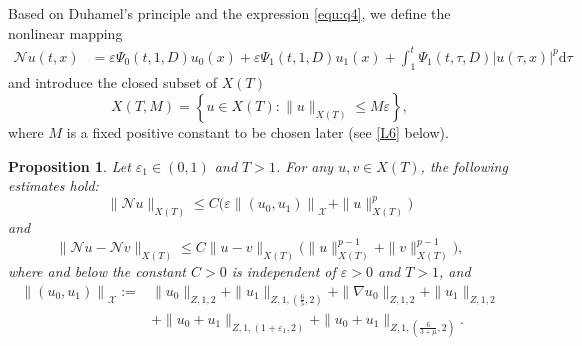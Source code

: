 \documentclass[11pt,twoside]{article}
\newcommand{\ve}{\varepsilon}
\newcommand{\f}{\frac}
\theoremstyle{plain}
\newtheorem{proposition}{Proposition}[section]
\theoremstyle{definition}
\theoremstyle{remark}
\numberwithin{equation}{section}
\begin{document}
Based on Duhamel's principle and the  expression \eqref{equ:q4}, we define the nonlinear mapping
\begin{equation}\label{Q2}
\begin{aligned}
\mathcal{N} u(t, x)&=\ve\Psi_{0}(t, 1, D)u_{0}(x)+\ve\Psi_{1}(t, 1, D) u_{1}(x)
+\int_{1}^{t} \Psi_{1}(t, \tau, D)|u(\tau, x)|^{p} \mathrm{d} \tau
\end{aligned}
\end{equation}
and introduce the  closed subset of $X(T)$
$$
X(T, M)=\left\{u \in X(T):\|u\|_{X(T)} \leq M\ve\right\},
$$
where $M$ is a fixed positive constant to be chosen later (see \eqref{L6} below).
\begin{proposition}\label{prop-1}
Let $\varepsilon_1\in(0,1)$ and $T>1$. For any  $u, v \in X(T)$, the following estimates hold:
\begin{equation}\label{Q3}
\|\mathcal{N} u\|_{X(T)} \leq C\big(\ve\left\|\left(u_{0}, u_{1}\right)\right\|_{\mathcal{X}}+\|u\|_{X(T)}^{p}\big)
\end{equation}
and
\begin{equation}\label{Q4}
\|\mathcal{N} u-\mathcal{N} v\|_{X(T)} \leq C\|u-v\|_{X(T)}\big(\|u\|_{X(T)}^{p-1}+\|v\|_{X(T)}^{p-1}\big),
\end{equation}
where and below the constant $C>0$ is independent of $\ve>0$ and $T>1$, and
\begin{equation}\label{Q5}
\begin{aligned}
\left\|\left(u_{0}, u_{1}\right)\right\|_{\mathcal{X}}:=&\|u_0\|_{Z, 1, 2}+\|u_1\|_{Z, 1, (\f65, 2)}+\|\nabla u_0\|_{Z, 1, 2}
+\|u_1\|_{Z, 1, 2}\\
&+\|u_0+u_1\|_{Z, 1, (1+\varepsilon_1, 2)}+\|u_0+u_1\|_{Z, 1, (\f{6}{3+\mu}, 2)}.
\end{aligned}
\end{equation}
\end{proposition}
\end{document}
